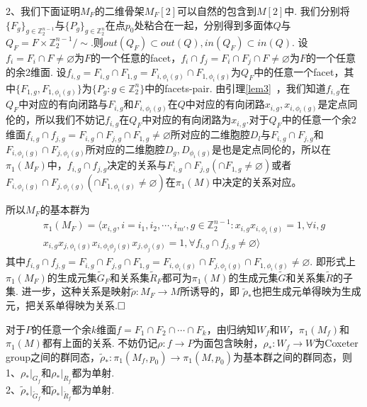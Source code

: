 \documentclass{article}
\theoremstyle{plain}%
\theoremstyle{definition}
\theoremstyle{remark}
\begin{document}
{%
2、我们下面证明$M_F$的二维骨架$M_F[2]$可以自然的包含到$M[2]$中. 我们分别将$\{F_g\}_{g\in \mathbb{Z}_2^{n-1}}$与$\{P_g\}_{g\in \mathbb{Z}_2^{n}}$在点$p_0$处粘合在一起，分别得到多面体$Q$与$Q_F=F\times \mathbb{Z}_2^{n-1}/\sim$.则$out(Q_F)\subset out(Q),in(Q_F)\subset in(Q)$. 设$f_{i}=F_i\cap F\neq \varnothing$为$F$的一个任意的facet，$f_i\cap f_j=F_i\cap F_j\cap F\neq \varnothing$为$F$的一个任意的余2维面. 设$f_{i,g}=F_{i,g}\cap F_{1,g}=F_{i,\phi_i(g)}\cap F_{1,\phi_i(g)}$为$Q_F$中的任意一个facet，其中$\{F_{1,g},F_{1,\phi_i(g)}\}$为$\{P_g: g\in \mathbb{Z}_2^n\}$中的facets-pair. 由引理\ref{lem3}~，我们知道$f_{i,g}$在$Q_F$中对应的有向闭路与$F_{i,g}$和$F_{i,\phi_i(g)}$在$Q$中对应的有向闭路$x_{i,g},x_{i,\phi_i(g)}$是定点同伦的，所以我们不妨记$f_{i,g}$在$Q_F$中对应的有向闭路为$x_{i,g}$.对于$Q_F$中的任意一个余$2$维面$f_{i,g}\cap f_{j,g}=F_{i,g}\cap F_{j,g}\cap F_{1,g}\neq\varnothing$所对应的二维胞腔$D_l$与$F_{i,g}\cap F_{j,g}$和$F_{i,\phi_i(g)}\cap F_{j,\phi_i(g)}$所对应的二维胞腔$D_{g},D_{\phi_i(g)}$是也是定点同伦的，所以在$\pi_1(M_F)$中，$f_{i,g}\cap f_{j,g}$决定的关系与$F_{i,g}\cap F_{j,g}(\cap F_{1,g}\neq \varnothing)$或者$F_{i,\phi_i(g)}\cap F_{j,\phi_i(g)}(\cap F_{1,\phi_i(g)}\neq \varnothing)$在$\pi_1(M)$中决定的关系对应。
\begin{figure}[h]
\centering
\def\svgwidth{0.6\textwidth}

\end{figure}
所以$M_F$的基本群为
\begin{multline}
\pi_1(M_F)=\langle x_{i,g},i=i_1,i_2,\cdots,i_{m'},g\in \mathbb{Z}_2^{n-1}:x_{i,g}x_{i,\phi_i(g)}=1,\forall i,g\\
x_{i,g}x_{j,\phi_i(g)}x_{i,\phi_i\phi_j(g)}x_{j,\phi_j(g)}=1,\forall f_{i,g}\cap f_{j,g}\neq \varnothing\rangle
\end{multline}
其中$f_{i,g}\cap f_{j,g}=F_{i,g}\cap F_{j,g}\cap F_{1,g}=F_{i,\phi_i(g)}\cap F_{j,\phi_i(g)}\cap F_{1,\phi_i(g)}\neq \varnothing$.
即形式上$\pi_1(M_F)$的生成元集$\widetilde{G}_F$和关系集$\widetilde{R}_F$都可为$\pi_1(M)$的生成元集$\widetilde{G}$和关系集$\widetilde{R}$的子集. 进一步，这种关系是映射$\widetilde{\rho}:M_F\longrightarrow M$所诱导的，即
$\widetilde{\rho}_{*}$也把生成元单得映为生成元，把关系单得映为关系.$\hfill{} \Box$


对于$P$的任意一个余$k$维面$f=F_1\cap F_2\cap\cdots\cap F_k$，由归纳知$W_f$和$W$，$\pi_1(M_f)$和$\pi_1(M)$都有上面的关系. 不妨仍记$\rho:f\longrightarrow P$为面包含映射，$\rho_*:W_f\longrightarrow W$为Coxeter group之间的群同态，$\widetilde{\rho}_*:\pi_1(M_f,p_0)\longrightarrow \pi_1(M,p_0)$为基本群之间的群同态，则
{\cor 
1、$\rho_*|_{G_f}$和$\rho_*|_{R_f}$都为单射.\\
2、$\widetilde{\rho}_*|_{\widetilde{G}_f}$和$\widetilde{\rho}_*|_{\widetilde{R}_f}$都为单射.\\
}

}
\end{document}
